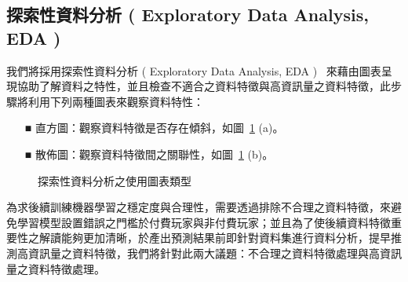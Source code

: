 \subsection{探索性資料分析 ( Exploratory Data Analysis, EDA ) }

我們將採用探索性資料分析 ( Exploratory Data Analysis, EDA )~\cite{tukey1977exploratory} 來藉由圖表呈現協助了解資料之特性，並且檢查不適合之資料特徵與高資訊量之資料特徵，此步驟將利用下列兩種圖表來觀察資料特性：

\begin{itemize}
  \item [■] 直方圖：觀察資料特徵是否存在傾斜，如圖~\ref{fig:Image_EDADiagrams} (a)。
  \item [■] 散佈圖：觀察資料特徵間之關聯性，如圖~\ref{fig:Image_EDADiagrams} (b)。
\end{itemize}

\begin{figure}[!htb]
  \centering
  \caption[探索性資料分析之使用圖表類型]{探索性資料分析之使用圖表類型}
  \label{fig:Image_EDADiagrams}
\end{figure}
\newpage

為求後續訓練機器學習之穩定度與合理性，需要透過排除不合理之資料特徵，來避免學習模型設置錯誤之門檻於付費玩家與非付費玩家；並且為了使後續資料特徵重要性之解讀能夠更加清晰，於產出預測結果前即針對資料集進行資料分析，提早推測高資訊量之資料特徵，我們將針對此兩大議題：不合理之資料特徵處理與高資訊量之資料特徵處理。

